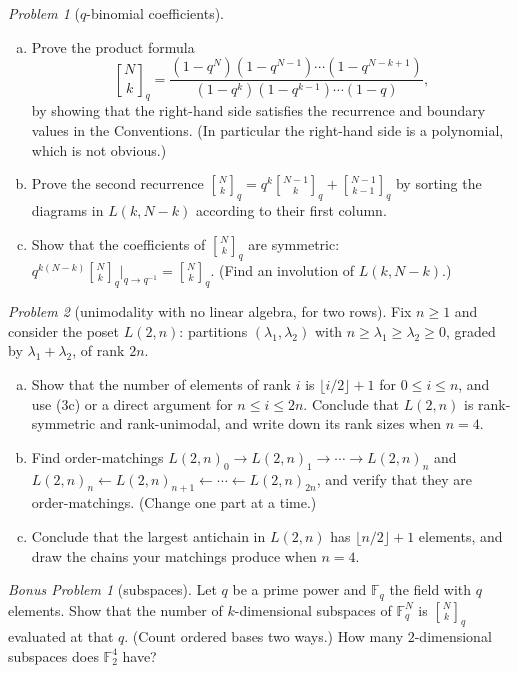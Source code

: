 \documentclass[11pt,twoside]{amsart}
\theoremstyle{plain}
\theoremstyle{remark}
\newtheorem{prob}{Problem}
\newtheorem*{bonus*}{Bonus Problem}
\theoremstyle{definition}
\newcommand{\FF}{\mathbb F}
\newcommand{\qbinom}[2]{\genfrac{[}{]}{0pt}{}{#1}{#2}_{\!q}}
\begin{document}
\begin{prob}[$q$-binomial coefficients]
\begin{enumerate}[(a)]
\item Prove the product formula
\[
\qbinom Nk=\frac{(1-q^N)(1-q^{N-1})\cdots(1-q^{N-k+1})}{(1-q^k)(1-q^{k-1})\cdots(1-q)},
\]
by showing that the right-hand side satisfies the recurrence and boundary values in the
Conventions. (In particular the right-hand side is a polynomial, which is not obvious.)
\item Prove the second recurrence $\qbinom Nk=q^{k}\qbinom{N-1}{k}+\qbinom{N-1}{k-1}$ by
sorting the diagrams in $L(k,N-k)$ according to their first column.
\item Show that the coefficients of $\qbinom Nk$ are symmetric:
$q^{k(N-k)}\qbinom Nk\big|_{q\to q^{-1}}=\qbinom Nk$. (Find an involution of $L(k,N-k)$.)
\end{enumerate}
\end{prob}

\begin{prob}[unimodality with no linear algebra, for two rows]
Fix $n\ge1$ and consider the poset $L(2,n)$: partitions $(\lambda_1,\lambda_2)$ with
$n\ge\lambda_1\ge\lambda_2\ge0$, graded by $\lambda_1+\lambda_2$, of rank $2n$.
\begin{enumerate}[(a)]
\item Show that the number of elements of rank $i$ is $\lfloor i/2\rfloor+1$ for $0\le i\le n$,
and use (3c) or a direct argument for $n\le i\le2n$. Conclude that $L(2,n)$ is rank-symmetric
and rank-unimodal, and write down its rank sizes when $n=4$.
\item Find order-matchings $L(2,n)_0\to L(2,n)_1\to\cdots\to L(2,n)_n$ and
$L(2,n)_n\leftarrow L(2,n)_{n+1}\leftarrow\cdots\leftarrow L(2,n)_{2n}$, and verify that they
are order-matchings. (Change one part at a time.)
\item Conclude that the largest antichain in $L(2,n)$ has $\lfloor n/2\rfloor+1$ elements, and
draw the chains your matchings produce when $n=4$.
\end{enumerate}
\end{prob}

\begin{bonus*}[subspaces]
Let $q$ be a prime power and $\FF_q$ the field with $q$ elements. Show that the number of
$k$-dimensional subspaces of $\FF_q^N$ is $\qbinom Nk$ evaluated at that $q$. (Count ordered
bases two ways.) How many $2$-dimensional subspaces does $\FF_2^4$ have?
\end{bonus*}
\end{document}
